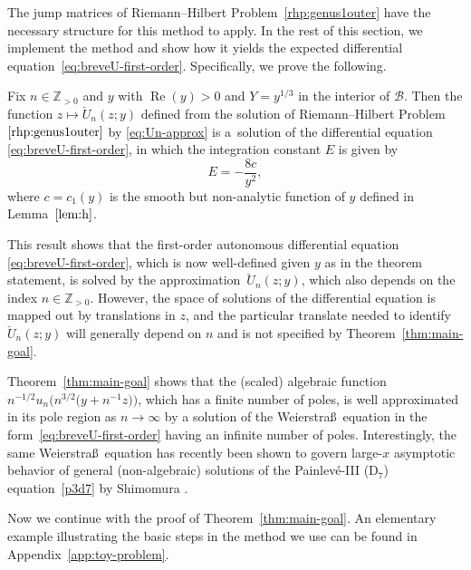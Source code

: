 The jump matrices of Riemann--Hilbert Problem~\ref{rhp:genus1outer} have the necessary structure for this method to apply. In the rest of this section, we implement the method and show how it yields the expected differential equation~\eqref{eq:breveU-first-order}. Specifically, we prove the following.
\begin{Theorem}\label{thm:main-goal}
Fix $n\in\mathbb{Z}_{>0}$ and $y$ with $\operatorname{Re}(y)>0$ and $Y=y^{1/3}$ in the
interior of $\mathcal{B}$. Then the function $z\mapsto \breve{U}_n(z;y)$ defined
from the solution of Riemann--Hilbert Problem~$\ref{rhp:genus1outer}$ by
\eqref{eq:Un-approx} is a~solution of the differential equation
\eqref{eq:breveU-first-order}, in which the integration constant $E$ is given by
\begin{equation}
E=-\frac{8c}{y^2},
\label{eq:Ec}
\end{equation}
where $c=c_1(y)$ is the smooth but non-analytic function of $y$ defined in Lemma~$\ref{lem:h}$.
\end{Theorem}

\begin{Remark}
This result shows that the first-order autonomous differential equation
\eqref{eq:breveU-first-order}, which is now well-defined given $y$ as in the theorem
statement, is solved by the approximation~$\breve{U}_n(z;y)$, which also depends on
the index $n\in\mathbb{Z}_{>0}$. However, the space of solutions of the differential
equation is mapped out by translations in $z$, and the particular translate needed to
identify $\breve{U}_n(z;y)$ will generally depend on $n$ and is not specified by
Theorem~\ref{thm:main-goal}.
\end{Remark}

\begin{Remark}
Theorem~\ref{thm:main-goal} shows that the (scaled) algebraic function
$n^{-1/2}u_n\bigl(n^{3/2}\bigl(y+n^{-1}z\bigr)\bigr)$, which has a finite number of poles, is well approximated in
its pole region as $n\to\infty$ by a solution of the Weierstra\ss\ equation
in the form~\eqref{eq:breveU-first-order} having an infinite number of poles. Interestingly, the same Weierstra\ss\ equation has
recently been shown to govern large-$x$ asymptotic behavior of general (non-algebraic)
solutions of the Painlev\'e-III (D$_7$) equation~\eqref{p3d7} by Shimomura
\cite{Shimomura:2022}.
\end{Remark}

Now we continue with the proof of Theorem~\ref{thm:main-goal}. An elementary example illustrating the basic steps in the method we use can be found in Appendix~\ref{app:toy-problem}.

